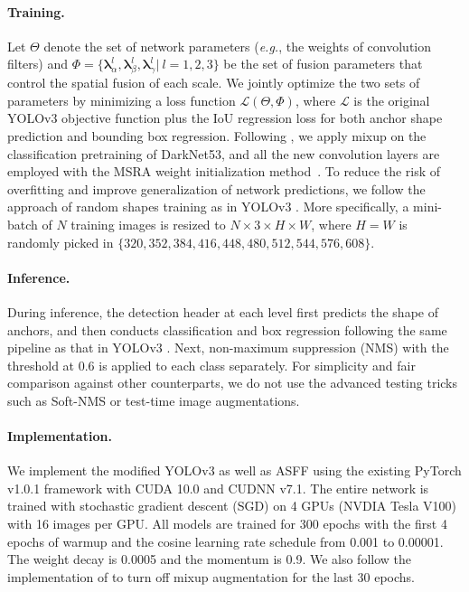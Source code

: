 \documentclass[10pt,twocolumn,letterpaper]{article}
\begin{document}
\paragraph{Training.} Let $\Theta$ denote the set of network parameters (\emph{e.g.}, the weights of convolution filters) and $\Phi = \{\mathbf{\lambda}^l_\alpha, \mathbf{\lambda}^l_\beta,\mathbf{\lambda}^l_\gamma |\ l = 1,2,3 \}$ be the set of fusion parameters that control the spatial fusion of each scale. We jointly optimize the two sets of parameters by minimizing a loss function $\mathcal{L}(\Theta, \Phi)$, where $\mathcal{L}$ is the original YOLOv3 objective function plus the IoU regression loss \cite{iouloss} for both anchor shape prediction and bounding box regression. Following \cite{bag}, we apply mixup on the classification pretraining of DarkNet53, and all the new convolution layers are employed with the MSRA weight initialization method~\cite{MSRA}. To reduce the risk of overfitting and improve generalization of network predictions, we follow the approach of random shapes training as in YOLOv3 \cite{yolov3}. More specifically, a mini-batch of $N$ training images is resized to $N\times 3 \times H \times W$, where $H = W$ is randomly picked in $\{320, 352, 384, 416, 448, 480, 512, 544, 576, 608\}$.

\paragraph{Inference.} During inference, the detection header at each level first predicts the shape of anchors, and then conducts classification and box regression following the same pipeline as that in YOLOv3 \cite{yolov3}. Next, non-maximum suppression (NMS) with the threshold at 0.6 is applied to each class separately. For simplicity and fair comparison against other counterparts, we do not use the advanced testing tricks such as Soft-NMS \cite{soft_nms} or test-time image augmentations.

\paragraph{Implementation.} We implement the modified YOLOv3 as well as ASFF using the existing PyTorch v1.0.1 framework with CUDA 10.0 and CUDNN v7.1. The entire network is trained with stochastic gradient descent (SGD) on 4 GPUs (NVDIA Tesla V100) with 16 images per GPU. All models are trained for 300 epochs with the first 4 epochs of warmup and the cosine learning rate schedule \cite{cosine} from 0.001 to 0.00001. The weight decay is 0.0005 and the momentum is 0.9. We also follow the implementation of \cite{bag} to turn off mixup augmentation for the last 30 epochs.
\end{document}
